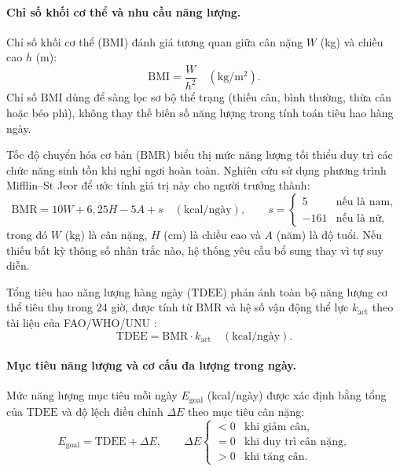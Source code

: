 \paragraph{Chỉ số khối cơ thể và nhu cầu năng lượng.}
Chỉ số khối cơ thể ($\mathrm{BMI}$) đánh giá tương quan giữa cân nặng $W$ (kg) và chiều cao $h$ (m):
\begin{equation}
    \mathrm{BMI} = \frac{W}{h^2} \quad (\mathrm{kg/m^2}).
    \label{eq:bmi}
\end{equation}
Chỉ số $\mathrm{BMI}$ dùng để sàng lọc sơ bộ thể trạng (thiếu cân, bình thường, thừa cân hoặc béo phì), không thay thế biến số năng lượng trong tính toán tiêu hao hàng ngày.

Tốc độ chuyển hóa cơ bản ($\mathrm{BMR}$) biểu thị mức năng lượng tối thiểu duy trì các chức năng sinh tồn khi nghỉ ngơi hoàn toàn. Nghiên cứu sử dụng phương trình Mifflin--St Jeor \cite{mifflin1990} để ước tính giá trị này cho người trưởng thành:
\begin{equation}
    \mathrm{BMR} = 10W + 6{,}25H - 5A + s \quad (\mathrm{kcal/ngày}),
    \qquad
    s = \begin{cases}
        5 & \text{nếu là nam},\\
        -161 & \text{nếu là nữ},
    \end{cases}
    \label{eq:bmr}
\end{equation}
trong đó $W$ (kg) là cân nặng, $H$ (cm) là chiều cao và $A$ (năm) là độ tuổi. Nếu thiếu bất kỳ thông số nhân trắc nào, hệ thống yêu cầu bổ sung thay vì tự suy diễn.

Tổng tiêu hao năng lượng hàng ngày ($\mathrm{TDEE}$) phản ánh toàn bộ năng lượng cơ thể tiêu thụ trong 24 giờ, được tính từ $\mathrm{BMR}$ và hệ số vận động thể lực $k_{\mathrm{act}}$ theo tài liệu của FAO/WHO/UNU \cite{energyRequirements1990}:
\begin{equation}
    \mathrm{TDEE} = \mathrm{BMR} \cdot k_{\mathrm{act}} \quad (\mathrm{kcal/ngày}).
    \label{eq:tdee}
\end{equation}

\paragraph{Mục tiêu năng lượng và cơ cấu đa lượng trong ngày.}
Mức năng lượng mục tiêu mỗi ngày $E_{\mathrm{goal}}$ (kcal/ngày) được xác định bằng tổng của $\mathrm{TDEE}$ và độ lệch điều chỉnh $\Delta E$ theo mục tiêu cân nặng:
\begin{equation}
    E_{\mathrm{goal}} = \mathrm{TDEE} + \Delta E,
    \qquad
    \Delta E \begin{cases}
        < 0 & \text{khi giảm cân},\\
        = 0 & \text{khi duy trì cân nặng},\\
        > 0 & \text{khi tăng cân}.
    \end{cases}
    \label{eq:e-goal}
\end{equation}

